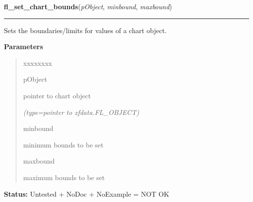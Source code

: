 \hspace{.8\funcindent}\begin{boxedminipage}{\funcwidth}

    \raggedright \textbf{fl\_set\_chart\_bounds}(\textit{pObject}, \textit{minbound}, \textit{maxbound})

    \vspace{-1.5ex}

    \rule{\textwidth}{0.5\fboxrule}
\setlength{\parskip}{2ex}
    Sets the boundaries/limits for values of a chart object.

\setlength{\parskip}{1ex}
      \textbf{Parameters}
      \vspace{-1ex}

      \begin{quote}
        \begin{Ventry}{xxxxxxxx}

          \item[pObject]

          pointer to chart object

            {\it (type=pointer to xfdata.FL\_OBJECT)}

          \item[minbound]

          minimum bounds to be set

          \item[maxbound]

          maximum bounds to be set

        \end{Ventry}

      \end{quote}

\textbf{Status:} Untested + NoDoc + NoExample = NOT OK



    \end{boxedminipage}

    \label{xformslib:library:fl_get_chart_bounds}

    \vspace{0.5ex}

